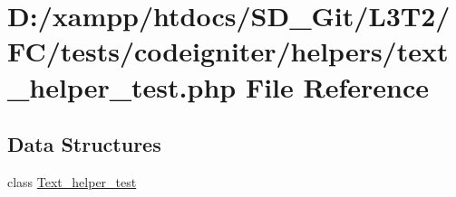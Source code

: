 \hypertarget{text__helper__test_8php}{}\section{D\+:/xampp/htdocs/\+S\+D\+\_\+\+Git/\+L3\+T2/\+F\+C/tests/codeigniter/helpers/text\+\_\+helper\+\_\+test.php File Reference}
\label{text__helper__test_8php}
\subsection*{Data Structures}
\begin{DoxyCompactItemize}
\item 
class \hyperlink{class_text__helper__test}{Text\+\_\+helper\+\_\+test}
\end{DoxyCompactItemize}
